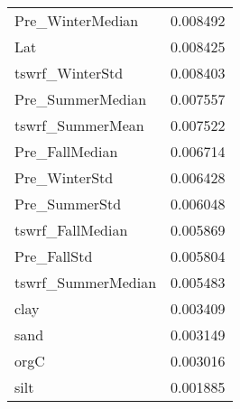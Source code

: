 \begin{tabular}{lr}
Pre_WinterMedian & 0.008492 \\
Lat & 0.008425 \\
tswrf_WinterStd & 0.008403 \\
Pre_SummerMedian & 0.007557 \\
tswrf_SummerMean & 0.007522 \\
Pre_FallMedian & 0.006714 \\
Pre_WinterStd & 0.006428 \\
Pre_SummerStd & 0.006048 \\
tswrf_FallMedian & 0.005869 \\
Pre_FallStd & 0.005804 \\
tswrf_SummerMedian & 0.005483 \\
clay & 0.003409 \\
sand & 0.003149 \\
orgC & 0.003016 \\
silt & 0.001885 \\
\bottomrule
\end{tabular}
